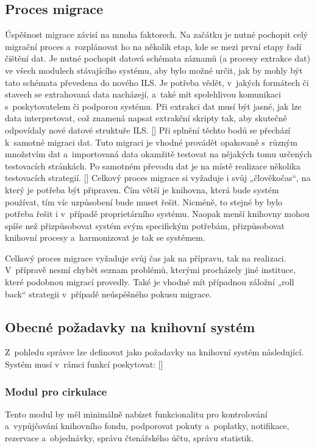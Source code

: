 \documentclass[
	11pt, oneside, printed, final, palatino, monochrome
	microtype,
	table,   %
	lof,     %
	lot     %
]{fithesis3}
\newcommand{\citepages}[2]{[\cite[#1]{#2}]}
\begin{document}
{\subsection{Proces migrace}
Úspěšnost migrace závisí na mnoha faktorech. Na začátku je nutné pochopit celý migrační proces a~rozplánovat ho na několik etap, kde se mezi první etapy řadí čištění dat. Je nutné pochopit datová schémata záznamů (a procesy extrakce dat) ve všech modulech stávajícího systému, aby bylo možné určit, jak by mohly být tato schémata převedena do nového ILS. Je potřeba vědět, v~jakých formátech či stavech se extrahovaná data nacházejí, a~také mít spolehlivou komunikaci s~poskytovatelem či podporou systému. Při extrakci dat musí být jasné, jak lze data interpretovat, což znamená napsat extrakční skripty tak, aby skutečně odpovídaly nové datové struktuře ILS. \citepages{43-48}{krbiwFHfrnvG2ZXf} Při splnění těchto bodů se přechází k~samotné migraci dat. Tuto migraci je vhodné provádět opakovaně s~různým množstvím dat a~importovaná data okamžitě testovat na nějakých tomu určených testovacích stránkách. Po samotném převodu dat je na místě realizace několika testovacích strategií. \citepages{32-35, 61-72}{Denar2015thesis} Celkový proces migrace si vyžaduje i svůj „člověkočas“, na který je potřeba být připraven. Čím větší je knihovna, která bude systém používat, tím víc uzpůsobení bude muset řešit. Nicméně, to stejné by bylo potřeba řešit i v~případě proprietárního systému. Naopak menší knihovny mohou spíše než přizpůsobovat systém svým specifickým potřebám, přizpůsobovat knihovní procesy a~harmonizovat je tak se systémem.

Celkový proces migrace vyžaduje svůj čas jak na přípravu, tak na realizaci. V~přípravě nesmí chybět seznam problémů, kterými procházely jiné instituce, které podobnou migrací provedly. Také je vhodné mít případnou záložní „roll back“ strategii v~případě neúspěšného pokusu migrace.

\subsection{Obecné požadavky na knihovní systém} \label{sec:obecne_pozadavky_na_knihovni_system}
Z~pohledu správce lze definovat jako požadavky na knihovní systém následující.
Systém musí v~rámci funkcí poskytovat: \citepages{8-12}{bilal_2014}

\subsubsection{Modul pro cirkulace}
Tento modul by měl minimálně nabízet funkcionalitu pro kontrolování a~vypůjčování knihovního fondu, podporovat pokuty a~poplatky, notifikace, rezervace a~objednávky, správu čtenářského účtu, správu statistik.

}
\end{document}
